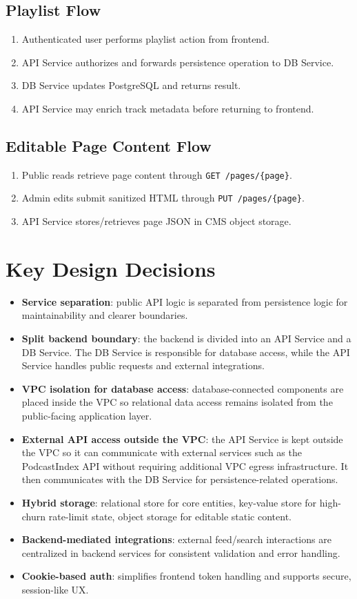 \documentclass{article}
\begin{document}
\subsection{Playlist Flow}
\begin{enumerate}
\item Authenticated user performs playlist action from frontend.
\item API Service authorizes and forwards persistence operation to DB Service.
\item DB Service updates PostgreSQL and returns result.
\item API Service may enrich track metadata before returning to frontend.
\end{enumerate}

\subsection{Editable Page Content Flow}
\begin{enumerate}
\item Public reads retrieve page content through \texttt{GET /pages/\{page\}}.
\item Admin edits submit sanitized HTML through \texttt{PUT /pages/\{page\}}.
\item API Service stores/retrieves page JSON in CMS object storage.
\end{enumerate}

\section{Key Design Decisions}
\begin{itemize}
\item \textbf{Service separation}: public API logic is separated from persistence logic for maintainability and clearer boundaries.
\item \textbf{Split backend boundary}: the backend is divided into an API Service and a DB Service. The DB Service is responsible for database access, while the API Service handles public requests and external integrations.
\item \textbf{VPC isolation for database access}: database-connected components are placed inside the VPC so relational data access remains isolated from the public-facing application layer.
\item \textbf{External API access outside the VPC}: the API Service is kept outside the VPC so it can communicate with external services such as the PodcastIndex API without requiring additional VPC egress infrastructure. It then communicates with the DB Service for persistence-related operations.
\item \textbf{Hybrid storage}: relational store for core entities, key-value store for high-churn rate-limit state, object storage for editable static content.
\item \textbf{Backend-mediated integrations}: external feed/search interactions are centralized in backend services for consistent validation and error handling.
\item \textbf{Cookie-based auth}: simplifies frontend token handling and supports secure, session-like UX.
\end{itemize}
\end{document}
